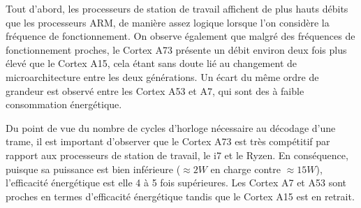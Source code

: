 Tout d'abord, les processeurs de station de travail affichent de plus hauts débits que les processeurs ARM, de manière assez logique lorsque l'on considère la fréquence de fonctionnement. On observe également que malgré des fréquences de fonctionnement proches, le Cortex A73 présente un débit environ deux fois plus élevé que le Cortex A15, cela étant sans doute lié au changement de microarchitecture entre les deux générations. Un écart du même ordre de grandeur est observé entre les Cortex A53 et A7, qui sont des \coeurs à faible consommation énergétique.

Du point de vue du nombre de cycles d'horloge nécessaire au décodage d'une trame, il est important d'observer que le Cortex A73 est très compétitif par rapport aux processeurs de station de travail, le i7 et le Ryzen. En conséquence, puisque sa puissance est bien inférieure ($\approx 2 W$ en charge contre $\approx 15 W$), l'efficacité énergétique est elle 4 à 5 fois supérieures. Les Cortex A7 et A53 sont proches en termes d'efficacité énergétique tandis que le Cortex A15 est en retrait.


